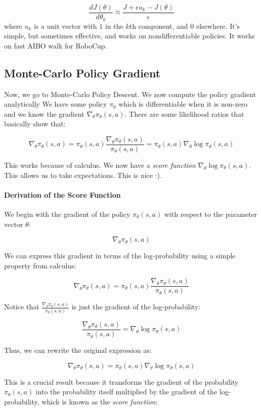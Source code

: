 \documentclass[10pt, oneside]{article}
\theoremstyle{definition}
\begin{document}
\[\frac{dJ(\theta)}{d\theta_k} \approx \frac{J + \epsilon u_k - J(\theta)}
{\epsilon}   \]
where $u_k$ is a unit vector with $1$ in the $k$th component, and $0$ elsewhere. It's simple, but sometimes effective, and works on nondifferentiable policies. It works on fast AIBO walk for RoboCup. 
\subsection{Monte-Carlo Policy Gradient}
Now, we go to Monte-Carlo Policy Descent. We now compute the policy gradient analytically We have some policy $\pi_\theta$ which is differentiable when it is non-zero and we know the gradient $\nabla_\theta \pi_\theta (s,a)$. There are some likelihood ratios that basically show that:

\[ \nabla_\theta \pi_\theta (s,a) = \pi_\theta (s,a) \frac{\nabla_\theta \pi_\theta (s,a)}{\pi_\theta (s,a)} =  \pi_\theta (s,a) \nabla_\theta \log{ \pi_\theta (s,a)} \]

This works because of calculus. 
We now have a \textit{score function} $\nabla_\theta \log{ \pi_\theta (s,a)}$. This allows us to take expectations. This is nice :). 
\paragraph{Derivation of the Score Function}

We begin with the gradient of the policy $\pi_\theta(s, a)$ with respect to the parameter vector $\theta$:

\[
\nabla_\theta \pi_\theta(s, a)
\]

We can express this gradient in terms of the log-probability using a simple property from calculus:

\[
\nabla_\theta \pi_\theta(s, a) = \pi_\theta(s, a) \frac{\nabla_\theta \pi_\theta(s, a)}{\pi_\theta(s, a)}
\]

Notice that $\frac{\nabla_\theta \pi_\theta(s, a)}{\pi_\theta(s, a)}$ is just the gradient of the log-probability:

\[
\frac{\nabla_\theta \pi_\theta(s, a)}{\pi_\theta(s, a)} = \nabla_\theta \log \pi_\theta(s, a)
\]

Thus, we can rewrite the original expression as:

\[
\nabla_\theta \pi_\theta(s, a) = \pi_\theta(s, a) \nabla_\theta \log \pi_\theta(s, a)
\]

This is a crucial result because it transforms the gradient of the probability $\pi_\theta(s, a)$ into the probability itself multiplied by the gradient of the log-probability, which is known as the \textit{score function}:
\end{document}
